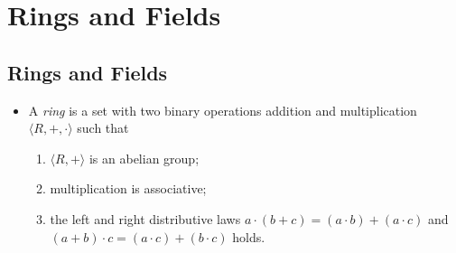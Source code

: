 \documentclass[11pt]{article}
\newcommand{\df}[1]{\textit{\textsf{#1}}}
\newcommand{\la}{\langle}
\newcommand{\ra}{\rangle}
\begin{document}
\section{Rings and Fields}
\setcounter{subsection}{17}
\subsection{Rings and Fields}
\begin{itemize}
	\item A \df{ring} is a set with two binary operations addition and multiplication $\la R, +, \cdot\ra$ such that \begin{enumerate}[label=(\alph*)]
	\item $\la R, +\ra$ is an abelian group;
	\item multiplication is associative;
	\item the left and right distributive laws $a\cdot(b+c) = (a\cdot b) + (a\cdot c)$ and $(a+b)\cdot c = (a\cdot c) + (b \cdot c)$ holds.
	\end{enumerate}
\end{itemize}
\end{document}

